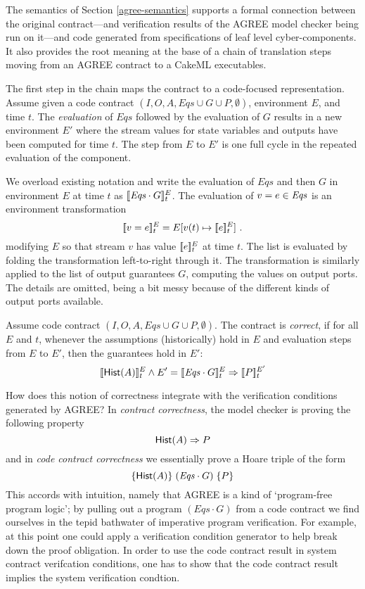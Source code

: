 The semantics of Section \ref{agree-semantics} supports a formal
connection between the original contract---and verification results of
the AGREE model checker being run on it---and code generated from
specifications of leaf level cyber-components. It also provides the
root meaning at the base of a chain of translation steps moving from
an AGREE contract to a CakeML executables.

The first step in the chain maps the contract to a code-focused
representation. Assume given a code contract
$(I,O,A,\mathit{Eqs} \cup G \cup P,\emptyset)$, environment $E$, and
time $t$. The \emph{evaluation} of $\mathit{Eqs}$ followed by the
evaluation of $G$ results in a new environment $E'$ where the stream
values for state variables and outputs have been computed for time
$t$. The step from $E$ to $E'$ is one full cycle in the repeated
evaluation of the component.

\begin{definition}[Evaluation]
We overload existing notation and write the evaluation of
$\mathit{Eqs}$ and then $G$ in environment $E$ at time $t$ as
$[\![ \mathit{Eqs}\cdot G ]\!]^E_t$. The evaluation of $v = e \in {\ensuremath{\mathit{Eqs}}}$
is an environment transformation
\[
 [\![ v = e ]\!]^E_t = E[v(t) \mapsto[\![ e ]\!]^E_t] \ .
\]
modifying $E$ so that stream $v$ has value $[\![ e ]\!]^E_t$ at time $t$.
The list {\Eqs} is evaluated by folding the transformation left-to-right
through it. The transformation is similarly applied to the list of output
guarantees $G$, computing the values on output ports. The details are
omitted, being a bit messy because of the different kinds of output
ports available.
\end{definition}


\begin{definition}
Assume code contract $(I,O,A,\mathit{Eqs} \cup G \cup P,\emptyset)$.
The contract is \emph{correct}, if for all $E$ and $t$, whenever the
assumptions (historically) hold in $E$ and evaluation steps from $E$
to $E'$, then the guarantees hold in $E'$:
\[
[\![ \mathsf{Hist}(A) ]\!]^E_t \land E' = [\![ \mathit{Eqs} \cdot G ]\!]^E_t \Rightarrow [\![ P ]\!]^{E'}_t
\]
\end{definition}

How does this notion of correctness integrate with the verification
conditions generated by AGREE? In \emph{contract correctness}, the
model checker is proving the following property
\[
\mathsf{Hist}(A) \Rightarrow P
\]
and in \emph{code contract correctness} we essentially prove a Hoare
triple of the form
\[
\{ {\mathsf{Hist}(A)} \}\; (\mathit{Eqs} \cdot G) \; \{ {P} \}
\]
This accords with intuition, namely that AGREE is a kind of
`program-free program logic'; by pulling out a program $(\mathit{Eqs}
\cdot G)$ from a code contract we find ourselves in the tepid
bathwater of imperative program verification. For example, at this
point one could apply a verification condition generator to help break
down the proof obligation. In order to use the code contract result in
system contract verifcation conditions, one has to show that the code
contract result implies the system verification condtion.

